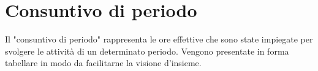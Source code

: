 \section{Consuntivo di periodo}
Il "consuntivo di periodo" rappresenta le ore effettive che sono state impiegate per svolgere le attività di un determinato periodo. Vengono presentate in forma tabellare in modo da facilitarne la visione d'insieme. 


